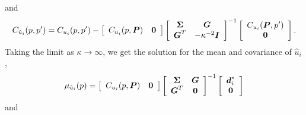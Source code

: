 \documentclass[extra,mreferee]{gji}
\begin{document}
and
\begin{equation}\label{eq:PosteriorCov2}
C_{\hat{u}_i}(p,p') = C_{u_i}(p,p') - 
                    \left[\begin{array}{cc}
                          C_{u_i}(p,\mitbf{P}) & \mitbf{0} \\
                          \end{array}\right]
                    \left[\begin{array}{cc}
                          \mitbf{\Sigma} & \mitbf{G} \\
                          \mitbf{G}^T  & -\kappa^{-2} \mitbf{I} \\
                          \end{array}\right]^{-1}
                    \left[\begin{array}{c}
                          C_{u_i}(\mitbf{P},p') \\
                          \mitbf{0} \\
                          \end{array}\right].
\end{equation}
Taking the limit as $\kappa \to \infty$, we get the solution for the mean and covariance of $\hat{u}_i$,
 \begin{equation}\label{eq:PosteriorMean3}
\mu_{\hat{u}_i}(p) = \left[\begin{array}{cc}
                         C_{u_i}(p,\mitbf{P}) & \mitbf{0} \\
                         \end{array}\right]
                   \left[\begin{array}{cc}
                         \mitbf{\Sigma} & \mitbf{G} \\
                         \mitbf{G}^T  & \mitbf{0} \\
                         \end{array}\right]^{-1}
                   \left[\begin{array}{c}
                         \mitbf{d}^*_i \\
                         \mitbf{0} \\
                         \end{array}\right]
\end{equation}    
and
\end{document}
